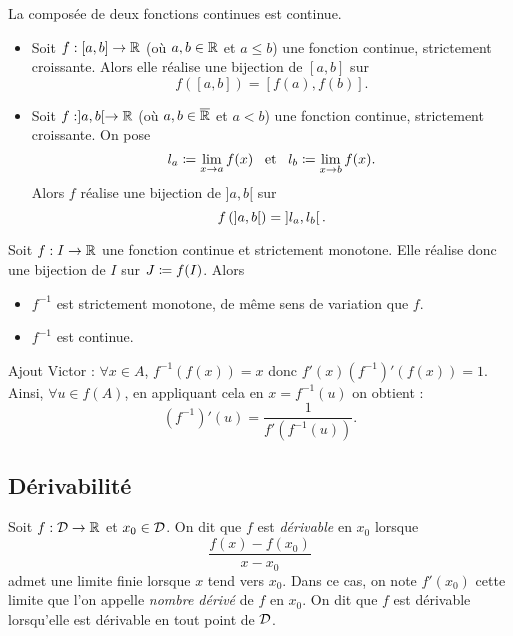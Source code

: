 \documentclass{magnolia}
\begin{document}
\begin{proposition}[utile=-3, nom={Théorèmes usuels}]
La composée de deux fonctions continues est continue.
\end{proposition}

\begin{theoreme}[nom={Théorème de la bijection}]
\begin{itemize}
\item Soit $f:[a,b]\to\mathbb{R}$ (où $a,b\in\mathbb{R}$ et $a\leq b$) une fonction continue, strictement croissante.
  Alors elle réalise une bijection de $[a,b]$ sur \[f([a,b])=[f(a),f(b)].\]
\item Soit $f:]a,b[\to\mathbb{R}$ (où $a,b\in\overline{\mathbb{R}}$ et $a<b$) une fonction continue, strictement croissante.
  On pose
  \[l_a\coloneqq\lim_{x\to a} f(x) \quad\!\text{et}\quad\! l_b\coloneqq\lim_{x\to b} f(x).\]
Alors $f$ réalise une bijection de $]a,b[$ sur \[f\left(\left]a,b\right[\right)=\left]l_a,l_b\right[.\]
\end{itemize}
\end{theoreme}

\begin{proposition}
Soit $f:I\to\mathbb{R}$ une fonction continue et strictement monotone. Elle
réalise donc une bijection de $I$ sur $J\coloneqq f(I)$. Alors
\begin{itemize}
\item $f^{-1}$ est strictement monotone, de même sens de variation que $f$. 
\item $f^{-1}$ est continue.
\end{itemize}
\end{proposition}

\begin{sol}
Ajout Victor : $\forall x \in A$, $f^{-1}(f(x))=x$ donc $f'(x)(f^{-1})'(f(x))=1$. Ainsi, $\forall u \in f(A)$, en appliquant cela en $x=f^{-1}(u)$ on obtient :
\[(f^{-1})'(u)=\frac{1}{f'(f^{-1}(u))}.\]
\end{sol}

\subsection{Dérivabilité}

\begin{definition}[utile=-3]
Soit $f:\mathcal{D}\to\mathbb{R}$ et $x_0\in\mathcal{D}$. On dit que $f$ est \emph{dérivable} en
$x_0$ lorsque
\[\frac{f(x)-f(x_0)}{x-x_0}\]
admet une limite finie lorsque $x$ tend vers $x_0$. Dans ce cas, on note $f'(x_0)$
cette limite que l'on appelle \emph{nombre dérivé} de $f$ en $x_0$.
On dit que $f$ est dérivable lorsqu'elle est dérivable en tout point de $\mathcal{D}$.
\end{definition}
\end{document}
